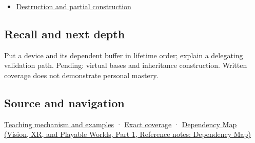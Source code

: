\hypertarget{appendix-3cb49709605a-used-by}{}

\begin{itemize}
\tightlist
\item
  \hyperref[appendix-9bfe377cef7a]{Destruction and partial construction}
\end{itemize}

\subsection{Recall and next depth}\label{appendix-3cb49709605a-recall-and-next-depth}

\hypertarget{appendix-3cb49709605a-recall-and-next-depth}{}

Put a device and its dependent buffer in lifetime order; explain a delegating validation path. Pending: virtual bases and inheritance construction. Written coverage does not demonstrate personal mastery.

\subsection{Source and navigation}\label{appendix-3cb49709605a-source-and-navigation}

\hypertarget{appendix-3cb49709605a-source-and-navigation}{}

\hyperref[01-foundations-i-ch003-construction-order-records-lifetime-dependencies]{Teaching mechanism and examples} · \hyperref[appendix-fd090d982a15-m009---parts-127-147]{Exact coverage} · \href{../07-Vision-XR-and-Playable-Worlds-P01/main.pdf\#nameddest=appendix-4ad47bdd269a}{Dependency Map (Vision, XR, and Playable Worlds, Part 1, Reference notes: Dependency Map)}
